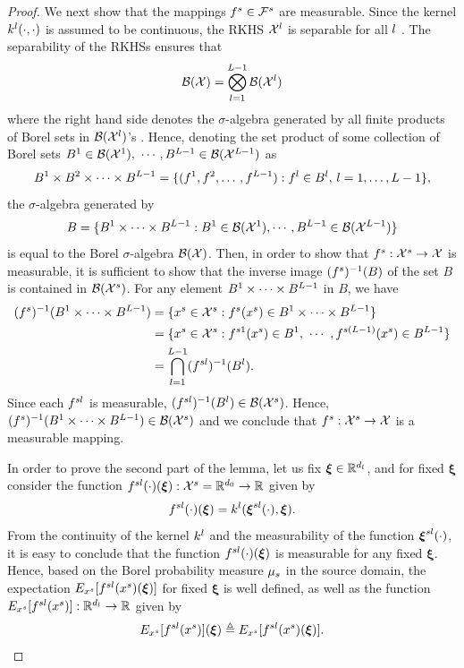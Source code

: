 \documentclass[review,supplement,onefignum,onetabnum]{siamonline250211}
\begin{document}
\begin{proof}
We next show that the mappings $f^s \in \mathcal{F}^s$ are measurable. Since the kernel $k^l(\cdot , \cdot ) $ is  assumed to be continuous, the RKHS $\mathcal{X}^l$ is separable for all $l$ \cite{SubediC19}. The separability of the RKHSs ensures that
%
\[
\mathcal{B}(\mathcal{X}) = \bigotimes_{l=1}^{L-1} \mathcal{B}(\mathcal{X}^l)
\]
%
where the right hand side denotes the $\sigma$-algebra generated by all finite products of Borel sets in $\mathcal{B}(\mathcal{X}^l)$'s \cite{Bogachev07}. Hence, denoting the set product of some collection of Borel sets $B^1 \in \B(\X^1), \ \cdots, B^{\numL-1} \in \B(\X^{\numL-1})$ as 
%
\[
B^1 \times B^2 \times \cdots \times B^{L-1}
    = \{ (f^1, f^2, \dots \, , f^{L-1}) : f^{l} \in B^{l}, \, l=1, \dots, L-1 \},
\]
%
the $\sigma$-algebra generated by
%
\[
B=\{ B^1 \times \cdots \times B^{L-1} : B^1 \in \mathcal{B}(\mathcal{X}^1), \cdots, B^{L-1} \in \mathcal{B}(\mathcal{X}^{L-1}) \}
\]
%
is equal to the Borel $\sigma$-algebra $\mathcal{B}(\mathcal{X})$. Then, in order to show that $f^s: \mathcal{X}^s \rightarrow \mathcal{X}$ is measurable, it is sufficient to show that the inverse image $(f^s)^{-1}(B)$ of the set $B$ is contained in $\mathcal{B}(\mathcal{X}^s)$. For any element $ B^1 \times \cdots \times B^{L-1}$ in $B$, we have
%
\begin{equation*}
\begin{split}
(f^s)^{-1} (B^1 \times \cdots \times B^{L-1}) 
&= \{ x^s \in \mathcal{X}^s : f^s(x^s) \in B^1 \times \cdots \times B^{L-1}\} \\
&=\{ x^s \in \mathcal{X}^s : f^{s1}(x^s)  \in B^1, \ \cdots \ , f^{s(L-1)}(x^s) \in  B^{L-1}\} \\
&= \bigcap_{l=1}^{L-1} (f^{sl})^{-1} (B^{l}).
\end{split}
\end{equation*}
%
Since each $f^{sl}$ is measurable, $(f^{sl})^{-1} (B^{l}) \in \mathcal{B}(\mathcal{X}^s)$. Hence, $(f^s)^{-1}(B^1 \times \cdots \times B^{L-1}) \in \mathcal{B}(\mathcal{X}^s)$ and we conclude that $f^s: \mathcal{X}^s \rightarrow \mathcal{X}$ is a measurable mapping. 

In order to prove the second part of the lemma, let us fix $\boldsymbol{\xi} \in \mathbb{R}^{d_l}$, and for fixed $\boldsymbol{\xi}$ consider the function $f^{sl}(\cdot)(\boldsymbol{\xi}): \mathcal{X}^s = \mathbb{R}^{{d_0}} \rightarrow \mathbb{R}$ given by
%
\[
f^{sl}(\cdot)(\boldsymbol{\xi})=k^l(\boldsymbol{\xi}^{sl}(\cdot),\boldsymbol{\xi}).
\]
%
From the continuity of the kernel $k^l$ and the measurability of the function $\boldsymbol{\xi}^{sl}(\cdot)$, it is easy to conclude that the function $f^{sl}(\cdot)(\boldsymbol{\xi})$ is measurable for any fixed $\boldsymbol{\xi}$. Hence, based on the Borel probability measure $\mu_s$ in the source domain, the expectation $E_{x^s}[f^{sl}(x^s)(\boldsymbol{\xi})]$ for fixed $\boldsymbol{\xi}$ is well defined, as well as the function $E_{x^s}[f^{sl}(x^s)]: \mathbb{R}^{d_l} \rightarrow \mathbb{R}$ given by
%
\[
E_{x^s}[f^{sl}(x^s)](\boldsymbol{\xi}) \triangleq E_{x^s}[f^{sl}(x^s)(\boldsymbol{\xi})].
\]


\end{proof}
\end{document}
